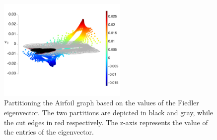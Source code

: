 \documentclass[unicode,11pt,a4paper,oneside,numbers=endperiod,openany]{scrartcl}
\begin{document}
\begin{figure}[!t]
	\begin{center}
		\includegraphics[width=0.55\textwidth]{images/fiedler_airfoil.png}
		\caption{Partitioning the Airfoil graph based on the values of the Fiedler eigenvector. The two partitions are depicted in black and gray, while the cut edges in red respectively. The z-axis represents the value of the entries of the eigenvector.}
		 \label{fig:fiedler_airfoil}
	\end{center}
\end{figure}
\end{document}
